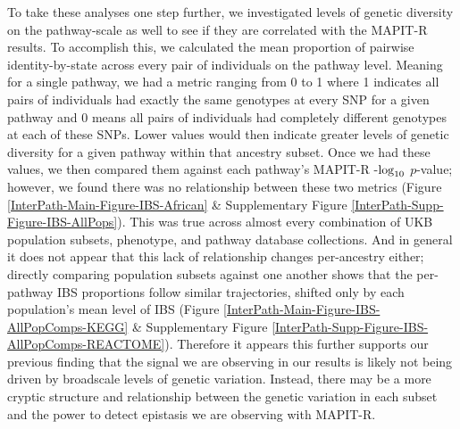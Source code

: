\documentclass[12pt,a4paper]{article}
\def\log{{\rm log}}
\begin{document}
To take these analyses one step further, we investigated levels of genetic diversity on the pathway-scale as well to see if they are correlated with the MAPIT-R results. To accomplish this, we calculated the mean proportion of pairwise identity-by-state across every pair of individuals on the pathway level. Meaning for a single pathway, we had a metric ranging from 0 to 1 where 1 indicates all pairs of individuals had exactly the same genotypes at every SNP for a given pathway and 0 means all pairs of individuals had completely different genotypes at each of these SNPs. Lower values would then indicate greater levels of genetic diversity for a given pathway within that ancestry subset. Once we had these values, we then compared them against each pathway's MAPIT-R -$\log_{10}$ $p$-value; however, we found there was no relationship between these two metrics (Figure \ref{InterPath-Main-Figure-IBS-African} \& Supplementary Figure \ref{InterPath-Supp-Figure-IBS-AllPops}). This was true across almost every combination of UKB population subsets, phenotype, and pathway database collections. And in general it does not appear that this lack of relationship changes per-ancestry either; directly comparing population subsets against one another shows that the per-pathway IBS proportions follow similar trajectories, shifted only by each population's mean level of IBS (Figure \ref{InterPath-Main-Figure-IBS-AllPopComps-KEGG} \& Supplementary Figure \ref{InterPath-Supp-Figure-IBS-AllPopComps-REACTOME}). Therefore it appears this further supports our previous finding that the signal we are observing in our results is likely not being driven by broadscale levels of genetic variation. Instead, there may be a more cryptic structure and relationship between the genetic variation in each subset and the power to detect epistasis we are observing with MAPIT-R.
\end{document}
